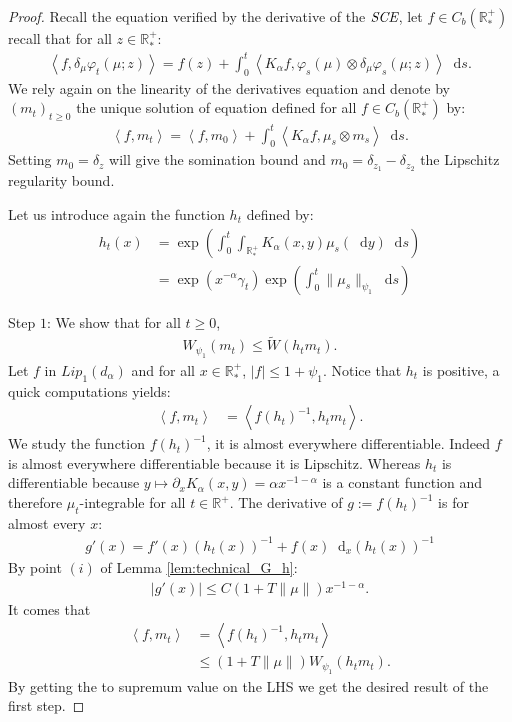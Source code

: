 \documentclass[11pt,a4paper]{article}
\newcommand{\RR}{\mathbb{R}}
\newcommand{\RRP}{\mathbb{R}^+_*}
\newcommand{\SCE}{\emph{SCE}}
\newcommand{\Proc}[1]{\left(#1\right)_{t\geq 0}}
\newcommand{\brac}[1]{\left\langle#1\right\rangle}
\newcommand{\dd}{\mathop{}\!\mathrm{d}}
\begin{document}
\begin{proof}
    Recall the equation verified by the derivative of the $\SCE$, let $f\in C_b(\RRP)$ recall that for all $z \in \RRP$:
    \begin{align*}
        \brac{f,\delta_\mu\varphi_t(\mu;z)} = f(z) + \int_0^t \brac{K_\alpha f, \varphi_s(\mu)\otimes\delta_\mu\varphi_s(\mu;z)} \dd s.
    \end{align*}
    We rely again on the linearity of the derivatives equation and denote by $\Proc{m_t}$ the unique solution of equation defined for all $f \in C_b(\RRP)$ by:
    \begin{align*}
        \brac{f,m_t} = \brac{f,m_0} + \int_0^t \brac{K_\alpha f, \mu_s \otimes m_s} \dd s.
    \end{align*}
    Setting $m_0 = \delta_z$ will give the somination bound and $m_0 = \delta_{z_1} - \delta_{z_2}$ the Lipschitz regularity bound. 

    Let us introduce again the function $h_t$ defined by:
    \begin{align*}
        h_t(x) &= \exp\left(\int_0^t \int_{\RRP}K_\alpha(x,y)\mu_s(\dd y) \dd s\right)\\
        &= \exp\left(x^{-\alpha}\gamma_t\right)\exp\left( {\int_0^t\|\mu_s\|_{\psi_1}\dd s}\right)  
    \end{align*}

    Step $1$: We show that for all $t \geq 0$, 
    \begin{align*}
        W_{\psi_1}\left(m_t\right) \leq \tilde{W}\left(h_tm_t\right).
    \end{align*}
    Let $f$ in $Lip_1(d_\alpha)$ and for all $x \in \RRP$, $|f| \leq 1 + \psi_1$. Notice that $h_t$ is positive, a quick computations yields:
    \begin{align*}
        \brac{f,m_t} &= \brac{f(h_t)^{-1},h_tm_t}.
    \end{align*}
    We study the function $f (h_t)^{-1}$, it is almost everywhere differentiable. Indeed $f$ is almost everywhere differentiable because it is Lipschitz. Whereas $h_t$ is differentiable because $y \mapsto \partial_x K_\alpha(x,y) = \alpha x^{-1-\alpha}$ is a constant function and therefore $\mu_t$-integrable for all $t \in \RR^+$. The derivative of $g:=f (h_t)^{-1}$ is for almost every $x$:
    \begin{align*}
        g'(x) = f'(x)(h_t(x))^{-1} + f(x) \dd_x(h_t(x))^{-1}
    \end{align*}
    By point $(i)$ of Lemma \ref{lem:technical_G_h}:
    \begin{align*}
        \left| g'(x) \right| \leq C(1 + T\|\mu\|) x^{-1-\alpha}.
    \end{align*}
    It comes that 
    \begin{align*}
        \brac{f,m_t} &= \brac{f(h_t)^{-1},h_tm_t} \\
        &\leq  \left(1 + T\|\mu\| \right)W_{\psi_1}\left(h_tm_t\right).
    \end{align*}
    By getting the to supremum value on the LHS we get the desired result of the first step.


\end{proof}
\end{document}
